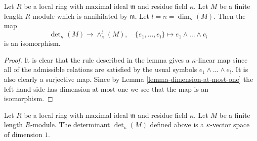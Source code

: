 \begin{lemma}
\label{lemma-compare-det}
Let $R$ be a local ring with maximal ideal $\mathfrak m$ and
residue field $\kappa$. Let $M$ be a finite length $R$-module
which is annihilated by $\mathfrak m$. Let $l = n = \dim_\kappa(M)$.
Then the map
$$
\det\nolimits_\kappa(M) \longrightarrow \wedge^l_\kappa(M),
\quad
\{e_1, \ldots, e_l\} \longmapsto e_1 \wedge \ldots \wedge e_l
$$
is an isomorphism.
\end{lemma}

\begin{proof}
It is clear that the rule described in the lemma gives a $\kappa$-linear
map since all of the admissible relations are satisfied by the usual
symbols $e_1 \wedge \ldots \wedge e_l$. It is also clearly a surjective
map. Since by Lemma \ref{lemma-dimension-at-most-one} the left hand side
has dimension at most one
we see that the map is an isomorphism.
\end{proof}

\begin{lemma}
\label{lemma-determinant-dimension-one}
Let $R$ be a local ring with maximal ideal $\mathfrak m$ and
residue field $\kappa$. Let $M$ be a finite length $R$-module.
The determinant $\det_\kappa(M)$ defined above is a $\kappa$-vector
space of dimension $1$.
\end{lemma}

